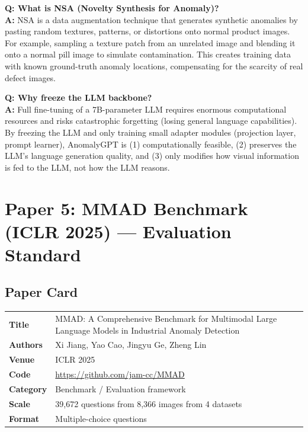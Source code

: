 \documentclass[12pt, a4paper]{article}
\begin{document}
\begin{vivaqa}
\textbf{Q: What is NSA (Novelty Synthesis for Anomaly)?}\\[4pt]
\textbf{A:} NSA is a data augmentation technique that generates synthetic anomalies by pasting random textures, patterns, or distortions onto normal product images. For example, sampling a texture patch from an unrelated image and blending it onto a normal pill image to simulate contamination. This creates training data with known ground-truth anomaly locations, compensating for the scarcity of real defect images.
\end{vivaqa}

\begin{vivaqa}
\textbf{Q: Why freeze the LLM backbone?}\\[4pt]
\textbf{A:} Full fine-tuning of a 7B-parameter LLM requires enormous computational resources and risks catastrophic forgetting (losing general language capabilities). By freezing the LLM and only training small adapter modules (projection layer, prompt learner), AnomalyGPT is (1) computationally feasible, (2) preserves the LLM's language generation quality, and (3) only modifies how visual information is fed to the LLM, not how the LLM reasons.
\end{vivaqa}



\section{Paper 5: MMAD Benchmark (ICLR 2025) --- Evaluation Standard}

\subsection{Paper Card}
\begin{tabularx}{\textwidth}{@{}lX@{}}
\toprule
\textbf{Title} & MMAD: A Comprehensive Benchmark for Multimodal Large Language Models in Industrial Anomaly Detection \\
\textbf{Authors} & Xi Jiang, Yao Cao, Jingyu Ge, Zheng Lin \\
\textbf{Venue} & ICLR 2025 \\
\textbf{Code} & \url{https://github.com/jam-cc/MMAD} \\
\textbf{Category} & Benchmark / Evaluation framework \\
\textbf{Scale} & 39,672 questions from 8,366 images from 4 datasets \\
\textbf{Format} & Multiple-choice questions \\
\bottomrule
\end{tabularx}
\end{document}
